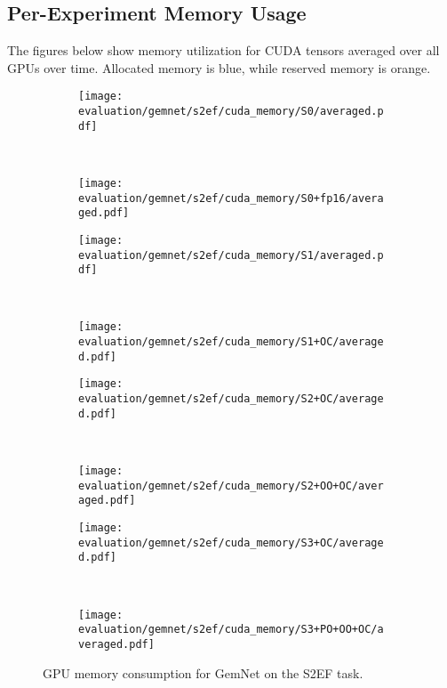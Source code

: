 \newpage

\subsection{Per-Experiment Memory Usage}

The figures below show memory utilization for 
CUDA tensors averaged over all GPUs over time. 
Allocated memory is \textcolor{tum-dark-blue}{blue},
while reserved memory is \textcolor{tum-orange}{orange}.

\begin{figure}[H]

    \centering

    \begin{subfigure}[t]{0.45\textwidth}
        \centering
        \texttt{[image: evaluation/gemnet/s2ef/cuda\_memory/S0/averaged.pdf]}
    \end{subfigure}%
    ~
    \begin{subfigure}[t]{0.45\textwidth}
        \centering
        \texttt{[image: evaluation/gemnet/s2ef/cuda\_memory/S0+fp16/averaged.pdf]}
    \end{subfigure}

    \begin{subfigure}[t]{0.45\textwidth}
        \centering
        \texttt{[image: evaluation/gemnet/s2ef/cuda\_memory/S1/averaged.pdf]}
    \end{subfigure}%
    ~
    \begin{subfigure}[t]{0.45\textwidth}
        \centering
        \texttt{[image: evaluation/gemnet/s2ef/cuda\_memory/S1+OC/averaged.pdf]}
    \end{subfigure}

    \begin{subfigure}[t]{0.45\textwidth}
        \centering
        \texttt{[image: evaluation/gemnet/s2ef/cuda\_memory/S2+OC/averaged.pdf]}
    \end{subfigure}%
    ~
    \begin{subfigure}[t]{0.45\textwidth}
        \centering
        \texttt{[image: evaluation/gemnet/s2ef/cuda\_memory/S2+OO+OC/averaged.pdf]}
    \end{subfigure}

    \begin{subfigure}[t]{0.45\textwidth}
        \centering
        \texttt{[image: evaluation/gemnet/s2ef/cuda\_memory/S3+OC/averaged.pdf]}
    \end{subfigure}%
    ~
    \begin{subfigure}[t]{0.45\textwidth}
        \centering
        \texttt{[image: evaluation/gemnet/s2ef/cuda\_memory/S3+PO+OO+OC/averaged.pdf]}
    \end{subfigure}

    \caption{GPU memory consumption for GemNet on the S2EF task.}
    
\end{figure}

